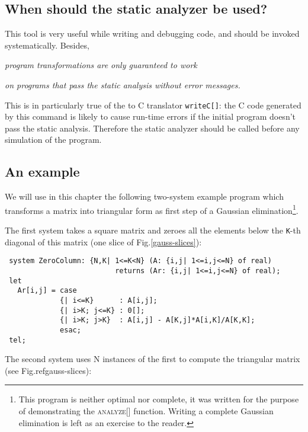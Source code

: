 \subsection{When should the static analyzer be used?}

This tool is very useful while writing and debugging {\alfa} code, and
should be invoked systematically. Besides, 

{\large
\begin{center}
\emph{{\alfa} program transformations are only guaranteed to work}

\emph{on programs that pass the static analysis without error messages.}

\end{center}
}

This is in particularly true of the {\alfa} to C translator 
\texttt{writeC[]}: the C code generated by this command is likely to
cause run-time errors if the initial {\alfa} program doesn't pass the
static analysis. Therefore the static analyzer should be called before any
simulation of the {\alfa} program.


\subsection{An example}

We will use in this chapter the following two-system example program
which transforms a matrix into triangular form as first step of a
Gaussian elimination\footnote{This program is neither optimal nor
complete, it was written for the purpose of demonstrating the
\textsc{analyze[]} function. Writing a complete Gaussian elimination
is left as an exercise to the reader.}.

The first system takes a square matrix and zeroes all the elements
below the \texttt{K}-th diagonal of this matrix (one slice of
Fig.\ref{gauss-slices}):

\begin{verbatim}
 system ZeroColumn: {N,K| 1<=K<N} (A: {i,j| 1<=i,j<=N} of real)
                          returns (Ar: {i,j| 1<=i,j<=N} of real);
 let
   Ar[i,j] = case
             {| i<=K}      : A[i,j];
             {| i>K; j<=K} : 0[];
             {| i>K; j>K}  : A[i,j] - A[K,j]*A[i,K]/A[K,K];
             esac;
 tel; 
\end{verbatim} 

The second system uses N instances of the first to compute the
triangular matrix (see Fig.ref{gauss-slices}):

